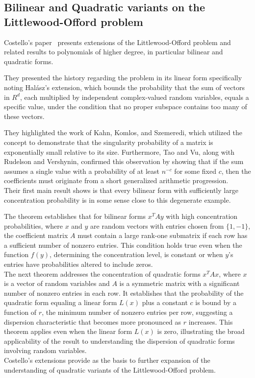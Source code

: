 \subsection{Bilinear and Quadratic variants on the Littlewood-Offord problem}

Costello's paper~\cite{costello2009bilinear} presents extensions of the Littlewood-Offord problem and related results to polynomials of higher degree, in particular bilinear and quadratic forms.

They presented the history regarding the problem in its linear form specifically noting Halász's extension, which bounds the probability that the sum of vectors in \(R^d\), each multiplied by independent complex-valued random variables, equals a specific value, under the condition that no proper subspace contains too many of these vectors.

They highlighted the work of Kahn, Komlos, and Szemeredi, which utilized the concept to demonstrate that the singularity probability of a matrix is exponentially small relative to its size. Furthermore, Tao and Vu, along with Rudelson and Vershynin, confirmed this observation by showing that if the sum assumes a single value with a probability of at least \(n^{-c}\) for some fixed \(c\), then the coefficients must originate from a short generalized arithmetic progression.\\

Their first main result shows is that every bilinear form with sufficiently large concentration probability is in some sense close to this degenerate example.

The theorem establishes that for bilinear forms \(x^T A y\) with high concentration probabilities, where \(x\) and \(y\) are random vectors with entries chosen from \(\{1, -1\}\), the coefficient matrix \(A\) must contain a large rank-one submatrix if each row has a sufficient number of nonzero entries. This condition holds true even when the function \(f(y)\), determining the concentration level, is constant or when \(y\)'s entries have probabilities altered to include zeros.\\

The next theorem addresses the concentration of quadratic forms \(x^T A x\), where \(x\) is a vector of random variables and \(A\) is a symmetric matrix with a significant number of nonzero entries in each row. It establishes that the probability of the quadratic form equaling a linear form \(L(x)\) plus a constant \(c\) is bound by a function of \(r\), the minimum number of nonzero entries per row, suggesting a dispersion characteristic that becomes more pronounced as \(r\) increases. This theorem applies even when the linear form \(L(x)\) is zero, illustrating the broad applicability of the result to understanding the dispersion of quadratic forms involving random variables.\\

Costello's extensions provide as the basis to further expansion of the understanding of quadratic variants of the Littlewood-Offord problem.